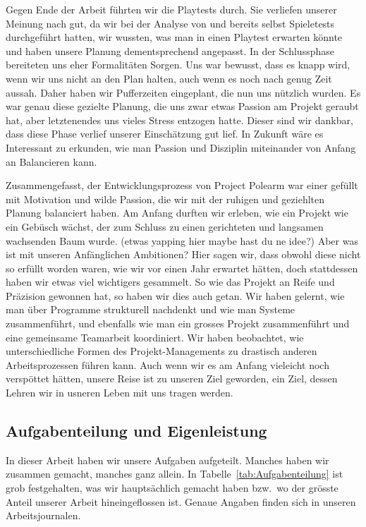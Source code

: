 \documentclass[../Main.tex]{subfiles}
\begin{document}
Gegen Ende der Arbeit führten wir die Playtests durch. Sie verliefen unserer Meinung nach gut, da wir bei der Analyse von  und  bereits selbst Spieletests durchgeführt hatten, wir wussten, was man in einen Playtest erwarten könnte und haben unsere Planung dementsprechend angepasst. In der Schlussphase bereiteten uns eher Formalitäten Sorgen. Uns war bewusst, dass es knapp wird, wenn wir uns nicht an den Plan halten, auch wenn es noch nach genug Zeit aussah. Daher haben wir Pufferzeiten eingeplant, die nun uns nützlich wurden. Es war genau diese gezielte Planung, die uns zwar etwas Passion am Projekt geraubt hat, aber letztenendes uns vieles Stress entzogen hatte. Dieser sind wir dankbar, dass diese Phase verlief unserer Einschätzung gut lief. In Zukunft wäre es Interessant zu erkunden, wie man Passion und Disziplin miteinander von Anfang an Balancieren kann.

Zusammengefasst, der Entwicklungsprozess von Project Polearm war einer gefüllt mit Motivation und wilde Passion, die wir mit der ruhigen und geziehlten Planung balanciert haben. Am Anfang durften wir erleben, wie ein Projekt wie ein Gebüsch wächst, der zum Schluss zu einen gerichteten und langsamen wachsenden Baum wurde. (etwas yapping hier maybe hast du ne idee?) Aber was ist mit unseren Anfänglichen Ambitionen? Hier sagen wir, dass obwohl diese nicht so erfüllt worden waren, wie wir vor einen Jahr erwartet hätten, doch stattdessen haben wir etwas viel wichtigers gesammelt. So wie das Projekt an Reife und Präzision gewonnen hat, so haben wir dies auch getan. Wir haben gelernt, wie man über Programme strukturell nachdenkt und wie man Systeme zusammenführt, und ebenfalls wie man ein grosses Projekt zusammenführt und eine gemeinsame Teamarbeit koordiniert. Wir haben beobachtet, wie unterschiedliche Formen des Projekt-Managements zu drastisch anderen Arbeitsprozessen führen kann. Auch wenn wir es am Anfang vieleicht noch verspöttet hätten, unsere Reise ist zu unseren Ziel geworden, ein Ziel, dessen Lehren wir in usneren Leben mit uns tragen werden.

\subsection{Aufgabenteilung und Eigenleistung} \label{sec:Aufgabenteilung}

In dieser Arbeit haben wir unsere Aufgaben aufgeteilt. Manches haben wir zusammen gemacht, manches ganz allein. In Tabelle~\ref{tab:Aufgabenteilung} ist grob festgehalten, was wir hauptsächlich gemacht haben bzw.\ wo der grösste Anteil unserer Arbeit hineingeflossen ist. Genaue Angaben finden sich in unseren Arbeitsjournalen.
\end{document}
